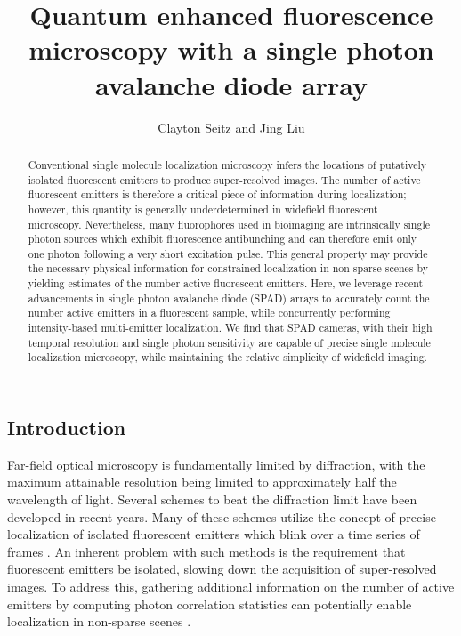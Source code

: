 \documentclass[a4paper, twocolumn, superscriptaddress,prl]{revtex4}  %
\begin{document}
\title{Quantum enhanced fluorescence microscopy with a single photon avalanche diode array}
\author{Clayton Seitz and Jing Liu}

\begin{abstract}
Conventional single molecule localization microscopy infers the locations of putatively isolated fluorescent emitters to produce super-resolved images. The number of active fluorescent emitters is therefore a critical piece of information during localization; however, this quantity is generally underdetermined in widefield fluorescent microscopy. Nevertheless, many fluorophores used in bioimaging are intrinsically single photon sources which exhibit fluorescence antibunching and can therefore emit only one photon following a very short excitation pulse. This general property may provide the necessary physical information for constrained localization in non-sparse scenes by yielding estimates of the number active fluorescent emitters. Here, we leverage recent advancements in single photon avalanche diode (SPAD) arrays to accurately count the number active emitters in a fluorescent sample, while concurrently performing intensity-based multi-emitter localization. We find that SPAD cameras, with their high temporal resolution and single photon sensitivity are capable of precise single molecule localization microscopy, while maintaining the relative simplicity of widefield imaging. 
\end{abstract}

\maketitle 

\subsection{Introduction}

Far-field optical microscopy is fundamentally limited by diffraction, with the maximum attainable resolution being limited to approximately half the wavelength of light. Several schemes to beat the diffraction limit have been developed in recent years. Many of these schemes utilize the concept of precise localization of isolated fluorescent emitters which blink over a time series of frames \citep{Rust2006,Betzig2006}. An inherent problem with such methods is the requirement that fluorescent emitters be isolated, slowing down the acquisition of super-resolved images. To address this, gathering additional information on the number of active emitters by computing photon correlation statistics can potentially enable localization in non-sparse scenes \citep{Ta2010}. 
\end{document}
